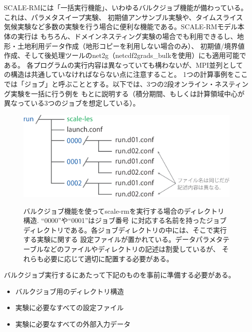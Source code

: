 \section{\SecAdvanceBulkjob} \label{sec:bulkjob}

SCALE-RMには「一括実行機能」、いわゆるバルクジョブ機能が備わっている。これは、パラメタスイープ実験、
初期値アンサンブル実験や、タイムスライス気候実験など多数の実験を行う場合に便利な機能である。SCALE-RMモデル本体の実行は
もちろん、ドメインネスティング実験の場合でも利用できるし、地形・土地利用データ作成（地形コピーを利用しない場合のみ）、
初期値/境界値作成、そして後処理ツールのnet2g（netcdf2grads\_bulkを使用）にも適用可能である。
各プログラムの実行内容は異なっていても構わないが、MPI並列としての構造は共通していなければならない点に注意すること。
1つの計算事例をここでは「ジョブ」と呼ぶこととする。以下では、3つの2段オンライン・ネスティング実験を一括に行う例を
もとに説明する（積分期間、もしくは計算領域中心が異なっている3つのジョブを想定している）。


\begin{figure}[t]
\begin{center}
  \includegraphics[width=0.6\hsize]{./figure/bulkjob_directory_structure.eps}\\
  \caption{バルクジョブ機能を使ってscale-rmを実行する場合のディレクトリ構造. ``0000''や``0001''はジョブ番号
           に対応する名前を持ったジョブディレクトリである。各ジョブディレクトリの中には、そこで実行する実験に関する
           設定ファイルが置かれている。データパラメタテーブルなどのファイルやディレクトリの記述は割愛しているが、
           それらも必要に応じて適切に配置する必要がある。}
  \label{fig_bulkjob}
\end{center}
\end{figure}


バルクジョブ実行するにあたって下記のものを事前に準備する必要がある。
\begin{itemize}
\item バルクジョブ用のディレクトリ構造
\item 実験に必要なすべての設定ファイル
\item 実験に必要なすべての外部入力データ
\end{itemize}

